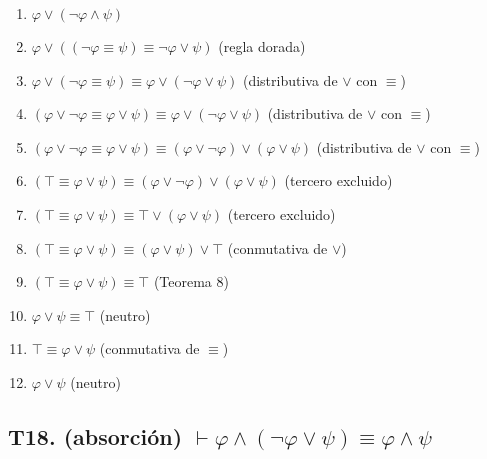 \documentclass[a4paper,11pt]{article}
\begin{document}
\begin{enumerate}
    \item $\varphi \lor (\neg\varphi \land \psi)$
    \item $\varphi \lor ((\neg\varphi \equiv \psi) \equiv \neg\varphi \lor \psi)$ \hfill (regla dorada)
    \item $\varphi \lor (\neg\varphi \equiv \psi) \equiv \varphi \lor (\neg\varphi \lor \psi)$ \hfill (distributiva de $\lor$ con $\equiv$)
    \item $(\varphi \lor \neg\varphi \equiv \varphi \lor \psi) \equiv \varphi \lor (\neg\varphi \lor \psi)$ \hfill (distributiva de $\lor$ con $\equiv$)
    \item $(\varphi \lor \neg\varphi \equiv \varphi \lor \psi) \equiv (\varphi \lor \neg\varphi) \lor (\varphi \lor \psi)$ \hfill (distributiva de $\lor$ con $\equiv$)
    \item $(\top \equiv \varphi \lor \psi) \equiv (\varphi \lor \neg\varphi) \lor (\varphi \lor \psi)$ \hfill (tercero excluido)
    \item $(\top \equiv \varphi \lor \psi) \equiv \top \lor (\varphi \lor \psi)$ \hfill (tercero excluido)
    \item $(\top \equiv \varphi \lor \psi) \equiv (\varphi \lor \psi) \lor \top$ \hfill (conmutativa de $\lor$)
    \item $(\top \equiv \varphi \lor \psi) \equiv \top$ \hfill (Teorema 8)
    \item $\varphi \lor \psi \equiv \top$ \hfill (neutro)
    \item $\top \equiv \varphi \lor \psi$ \hfill (conmutativa de $\equiv$)
    \item $\varphi \lor \psi$ \hfill (neutro)
\end{enumerate}


\subsection{T18. (absorción) $\vdash \varphi \land (\neg\varphi \lor \psi) \equiv \varphi \land \psi $}
\end{document}
